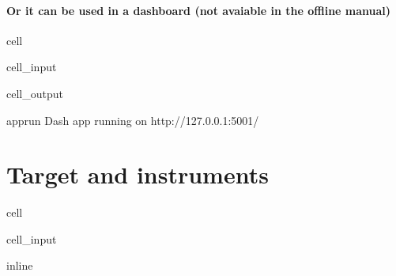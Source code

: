 \documentclass[letterpaper,10pt,english]{jupyterBook}
\begin{document}
\subsection{Or it can be used in a dashboard (not avaiable in the offline manual)}
\label{\detokenize{content/howto/attribution/Attribution background:or-it-can-be-used-in-a-dashboard-not-avaiable-in-the-offline-manual}}
\begin{sphinxuseclass}{cell}\begin{sphinxVerbatimInput}

\begin{sphinxuseclass}{cell_input}
\begin{sphinxVerbatim}[commandchars=\\\{\}]
\end{sphinxVerbatim}

\end{sphinxuseclass}\end{sphinxVerbatimInput}
\begin{sphinxVerbatimOutput}

\begin{sphinxuseclass}{cell_output}
\begin{sphinxVerbatim}[commandchars=\\\{\}]
apprun
Dash app running on http://127.0.0.1:5001/
\end{sphinxVerbatim}

\end{sphinxuseclass}\end{sphinxVerbatimOutput}

\end{sphinxuseclass}
\sphinxstepscope


\part{Target and instruments}

\sphinxstepscope

\begin{sphinxuseclass}{cell}\begin{sphinxVerbatimInput}

\begin{sphinxuseclass}{cell_input}
\begin{sphinxVerbatim}[commandchars=\\\{\}]
 inline
\end{sphinxVerbatim}

\end{sphinxuseclass}\end{sphinxVerbatimInput}

\end{sphinxuseclass}
\end{document}
